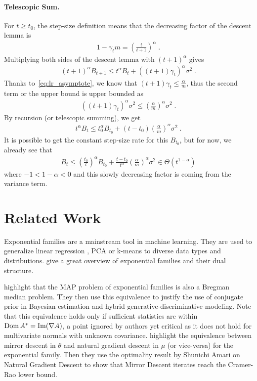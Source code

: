 \documentclass{article}
\newcommand{\logpart}{A}
\newcommand{\conj}{\logpart^*}
\newcommand{\nat}{\theta}
\newcommand{\meanp}{\mu}
\newcommand{\lr}{\gamma} %
\begin{document}
\paragraph{Telescopic Sum.}
For $t \geq t_0$, the step-size definition means that the decreasing factor of the descent lemma is
\begin{align}
	1- \lr_t m = \left(\frac{t}{t+1} \right)^\alpha  \; .
\end{align}
Multiplying both sides of the descent lemma with $(t+1)^\alpha$ gives
\begin{align}
	(t+1)^\alpha B_{t+1} 
	\leq t^\alpha B_t + ((t+1)\lr_t)^\alpha \sigma^2 \; .
\end{align}
Thanks to~\eqref{eq:lr_asymptote}, we know that $(t+1)\lr_t \leq \frac{\alpha}{m}$, thus the second term or the upper bound is upper bounded as
\begin{align}
	((t+1)\lr_t)^\alpha \sigma^2  
	\leq \left(\frac{\alpha}{m} \right)^\alpha  \sigma^2 \; .
\end{align}
By recursion (or telescopic summing), we get
\begin{align}
	t^\alpha B_t \leq t_0^\alpha B_{t_0} 
	+ (t - t_0) \left(\frac{\alpha}{m} \right)^\alpha  \sigma^2  \; .
\end{align}
It is possible to get the constant step-size rate for this $B_{t_0}$, but for now, we already see that
\begin{align}
	B_t \leq \left(\frac{t_0}{t} \right)^\alpha B_{t_0} 
	+ \frac{t - t_0}{t^\alpha} \left(\frac{\alpha}{m} \right)^\alpha  \sigma^2 \in \Theta(t^{1-\alpha}) 
\end{align}
where $-1 <1-\alpha < 0$ and this slowly decreasing factor is coming from the variance term.



\section{Related Work}
Exponential families are a mainstream tool in machine learning. They are used  to generalize linear regression \citep{mccullagh1989generalized}, PCA \citep{collins2001generalization} or k-means \citep{banerjee2005clustering} to diverse data types and distributions.
\citet[Chapter 3]{wainwright2008graphical} give a great overview of exponential families and their dual structure. 

\citet{agarwal2010geometric} highlight that the MAP problem of exponential families is also a Bregman median problem. They then use this equivalence to justify the use of conjugate prior in Bayesian estimation and hybrid generative-discriminative modeling.
Note that this equivalence holds only if sufficient statistics are within $\dom \conj  = \mathrm{Im} (\nabla\logpart)$, a point ignored by authors yet critical as it does not hold for multivariate normals with unknown covariance. 
\citet{raskutti2015information} highlight the equivalence between mirror descent in $\nat$ and natural gradient descent in $\meanp$ (or vice-versa) for the exponential family. Then they use the optimality result by Shunichi Amari on Natural Gradient Descent to show that Mirror Descent iterates reach the Cramer-Rao lower bound.
\end{document}

